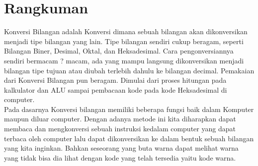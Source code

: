 \section{Rangkuman}
Konversi Bilangan adalah Konversi dimana sebuah bilangan akan dikonversikan menjadi tipe bilangan yang lain. Tipe bilangan sendiri cukup beragam, seperti Bilangan Biner, Desimal, Oktal, dan Heksadesimal. Cara pengonversiannya sendiri bermacam ? macam, ada yang mampu langsung dikonversikan menjadi bilangan tipe tujuan atau diubah terlebih dahulu ke bilangan decimal. Pemakaian dari Konversi Bilangan pun beragam. Dimulai dari proses hitungan pada kalkulator dan ALU sampai pembacaan kode pada kode Heksadesimal di computer. 
\\Pada dasarnya Konversi bilangan memiliki beberapa fungsi baik dalam Komputer maupun diluar computer. Dengan adanya metode ini kita diharapkan dapat membaca dan mengkonversi sebuah instruksi kedalam computer yang dapat terbaca oleh computer lalu dapat dikonversikan ke dalam bentuk sebuah bilangan yang kita inginkan. Bahkan seseorang yang buta warna dapat melihat warna yang tidak bisa dia lihat dengan kode yang telah tersedia yaitu kode warna. 
\break
\break
\break
